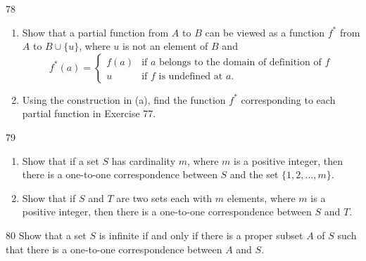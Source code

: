 \documentclass[11pt]{article}
\begin{document}
\begin{exercise}{78}
    \begin{enumerate}[label=(\alph*)]
        \item Show that a partial function from $A$ to $B$ can be
        viewed as a function $f^*$ from $A$ to $B \cup \{u\}$, where $u$
        is not an element of $B$ and
        \[
        f^*(a) =
        \begin{cases}
            f(a) & \text{if } a \text{ belongs to the domain of
            definition of } f \\
            u & \text{if } f \text{ is undefined at } a.
        \end{cases}
        \]
        \item Using the construction in (a), find the function $f^*$
        corresponding to each partial function in Exercise 77.
    \end{enumerate}
\end{exercise}

\begin{exercise}{79}
    \begin{enumerate}[label=(\alph*)]
        \item Show that if a set $S$ has cardinality $m$, where $m$ is a
        positive integer, then there is a one-to-one correspondence
        between $S$ and the set $\{1, 2, \dots, m\}$.
        \item Show that if $S$ and $T$ are two sets each with $m$
        elements, where $m$ is a positive integer, then there is a
        one-to-one correspondence between $S$ and $T$.
    \end{enumerate}
\end{exercise}

\begin{exercise}{80}
    Show that a set $S$ is infinite if and only if there is a proper
    subset $A$ of $S$ such that there is a one-to-one correspondence
    between $A$ and $S$.
\end{exercise}
\end{document}
